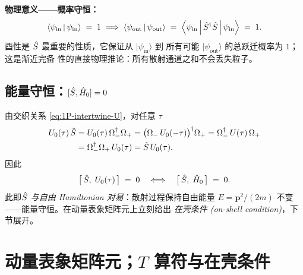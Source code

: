 \textbf{物理意义——概率守恒：}
\begin{equation}
  \left\langle \psi_{\text{in}} \,\middle|\, \psi_{\text{in}} \right\rangle \;=\; 1
  \;\Longrightarrow\;
  \left\langle \psi_{\text{out}} \,\middle|\, \psi_{\text{out}} \right\rangle
  \;=\; \left\langle \psi_{\text{in}} \,\middle|\, \hat{S}^{\dagger}\hat{S} \,\middle|\, \psi_{\text{in}} \right\rangle
  \;=\; 1.
  \label{eq:1P-probConserve}
\end{equation}
酉性是 $\hat{S}$ 最重要的性质，它保证从 $|\psi_{\text{in}}\rangle$ 到
所有可能 $|\psi_{\text{out}}\rangle$ 的总跃迁概率为 $1$；这是渐近完备
性的直接物理推论：所有散射通道之和不会丢失粒子。

\subsection{能量守恒：$[\hat{S},\hat{H}_0]=0$}
\label{ssec:1P-Senergy}

由交织关系 \eqref{eq:1P-intertwine-U}，对任意 $\tau$
\begin{align*}
  U_0(\tau)\,\hat{S}
  &= U_0(\tau)\,\Omega_-^{\dagger}\Omega_+
   = \bigl(\Omega_-\,U_0(-\tau)\bigr)^{\dagger}\Omega_+
   = \Omega_-^{\dagger}\,U(\tau)\,\Omega_+\\
  &= \Omega_-^{\dagger}\Omega_+\,U_0(\tau)
   = \hat{S}\,U_0(\tau).
\end{align*}
因此
\begin{equation}
  \bigl[\,\hat{S},\;U_0(\tau)\,\bigr] \;=\; 0
  \quad\Longleftrightarrow\quad
  \bigl[\,\hat{S},\;\hat{H}_0\,\bigr] \;=\; 0.
  \label{eq:1P-Scommute}
\end{equation}
此即\emph{$\hat{S}$ 与自由 Hamiltonian 对易}：散射过程保持自由能量
$E=\mathbf{p}^2/(2m)$ 不变——能量守恒。在动量表象矩阵元上立刻给出
\emph{在壳条件 (on-shell condition)}，下节展开。

\section{动量表象矩阵元；$T$ 算符与在壳条件}
\label{sec:1P-Tmatrix}

